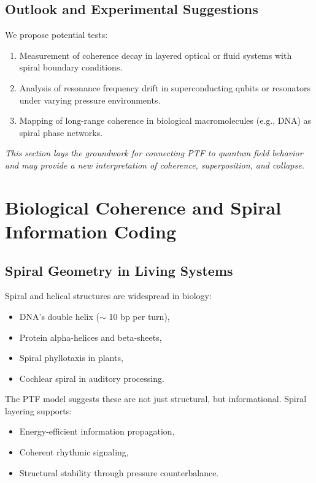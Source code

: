 \documentclass[a4paper,12pt]{article}
\begin{document}
\subsection{Outlook and Experimental Suggestions}

We propose potential tests:
\begin{enumerate}
    \item Measurement of coherence decay in layered optical or fluid systems with spiral boundary conditions.
    \item Analysis of resonance frequency drift in superconducting qubits or resonators under varying pressure environments.
    \item Mapping of long-range coherence in biological macromolecules (e.g., DNA) as spiral phase networks.
\end{enumerate}

\vspace{0.5em}
\noindent
\textit{This section lays the groundwork for connecting PTF to quantum field behavior and may provide a new interpretation of coherence, superposition, and collapse.}

\section{Biological Coherence and Spiral Information Coding}
\label{sec:bio-spiral}

\subsection{Spiral Geometry in Living Systems}

Spiral and helical structures are widespread in biology:
\begin{itemize}
    \item DNA’s double helix (\(\sim\) 10 bp per turn),
    \item Protein alpha-helices and beta-sheets,
    \item Spiral phyllotaxis in plants,
    \item Cochlear spiral in auditory processing.
\end{itemize}

The PTF model suggests these are not just structural, but informational. Spiral layering supports:
\begin{itemize}
    \item Energy-efficient information propagation,
    \item Coherent rhythmic signaling,
    \item Structural stability through pressure counterbalance.
\end{itemize}
\end{document}
